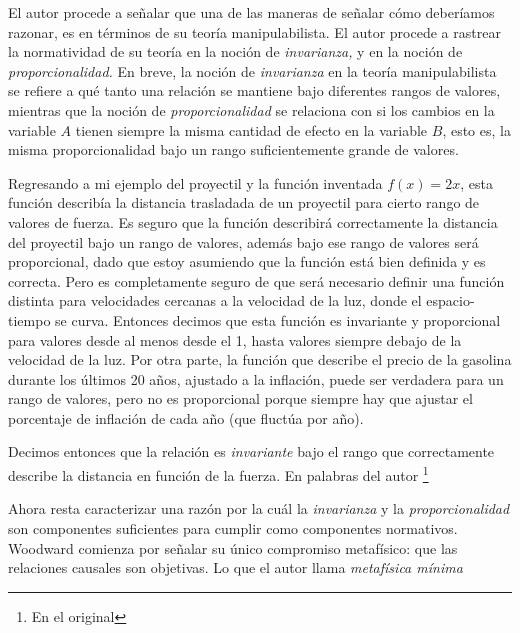 El autor procede a señalar que una de las maneras de señalar
cómo deberíamos razonar, es en términos de su  teoría
manipulabilista. El autor procede a rastrear la normatividad
de su teoría en la noción de \emph{invarianza,} y en la
noción de \emph{proporcionalidad.} En breve, la noción de
\emph{invarianza} en la teoría manipulabilista se refiere a
qué tanto una relación se mantiene bajo diferentes rangos de
valores, mientras que la noción de \emph{proporcionalidad}
se relaciona con si los cambios en la variable $ A $ tienen
siempre la misma cantidad de efecto en la variable $ B $,
esto es,  la misma proporcionalidad bajo un rango
suficientemente grande de valores. 


Regresando a mi ejemplo del proyectil y la función inventada
$ f(x) = 2x $, esta función describía la distancia
trasladada de un proyectil para cierto rango de valores de
fuerza. Es seguro que la función describirá correctamente la
distancia del proyectil bajo un rango de valores, además
bajo ese rango de valores será proporcional, dado que estoy
asumiendo que la función está bien definida y es correcta.
Pero es completamente seguro de que será necesario definir
una función distinta para velocidades cercanas a la
velocidad de la luz, donde el espacio-tiempo se curva.
Entonces decimos que esta función es invariante y
proporcional para valores desde al menos desde el 1, hasta
valores siempre debajo de la velocidad de la luz. Por otra
parte, la función que describe el precio de la gasolina
durante los últimos 20 años, ajustado a la inflación, puede
ser verdadera para un rango de valores, pero no es
proporcional porque siempre hay que ajustar el porcentaje de
inflación de cada año (que fluctúa por año).

Decimos entonces  que la relación es \emph{invariante} bajo
el rango que correctamente describe la distancia en función
de la fuerza. En palabras del autor \footnote{
    En el original 
}
\parencite[p.~15]{caushuman} 

Ahora resta caracterizar una razón por la cuál la
\emph{invarianza} y la \emph{proporcionalidad} son
componentes suficientes para cumplir como componentes
normativos. Woodward comienza por señalar su único
compromiso metafísico: que las relaciones causales son
objetivas. Lo que el autor llama \emph{metafísica mínima}

